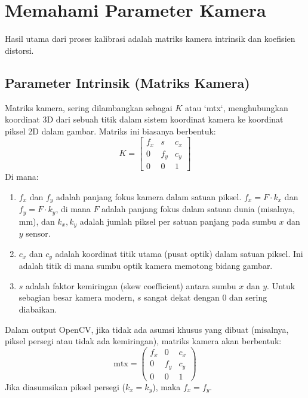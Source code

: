 \documentclass[12pt,a4paper]{article}
\begin{document}
\section{Memahami Parameter Kamera}
Hasil utama dari proses kalibrasi adalah matriks kamera intrinsik dan koefisien
distorsi.

\subsection{Parameter Intrinsik (Matriks Kamera)}
Matriks kamera, sering dilambangkan sebagai $K$ atau `mtx`, menghubungkan
koordinat 3D dari sebuah titik dalam sistem koordinat kamera ke koordinat
piksel 2D dalam gambar. Matriks ini biasanya berbentuk: $$ K = \begin{bmatrix} f_x & s & c_x \\ 0 & f_y & c_y \\ 0 & 0 & 1 \end{bmatrix} $$
Di mana:
\begin{enumerate}[label=\alph*.]
    \item $f_x$ dan $f_y$ adalah panjang fokus kamera dalam satuan piksel. $f_x = F \cdot k_x$ dan $f_y = F \cdot k_y$, di mana $F$ adalah panjang fokus dalam satuan dunia (misalnya, mm), dan $k_x, k_y$ adalah jumlah piksel per satuan panjang pada sumbu $x$ dan $y$ sensor.
    \item $c_x$ dan $c_y$ adalah koordinat titik utama (pusat optik) dalam satuan piksel. Ini adalah titik di mana sumbu optik kamera memotong bidang gambar.
    \item $s$ adalah faktor kemiringan (skew coefficient) antara sumbu $x$ dan $y$. Untuk sebagian besar kamera modern, $s$ sangat dekat dengan 0 dan sering diabaikan.
\end{enumerate}
Dalam output OpenCV, jika tidak ada asumsi khusus yang dibuat (misalnya, piksel persegi atau tidak ada kemiringan), matriks kamera akan berbentuk:
$$ \text{mtx} = \begin{pmatrix} f_x & 0 & c_x \\ 0 & f_y & c_y \\ 0 & 0 & 1 \end{pmatrix} $$
Jika diasumsikan piksel persegi ($k_x = k_y$), maka $f_x = f_y$.
\end{document}
